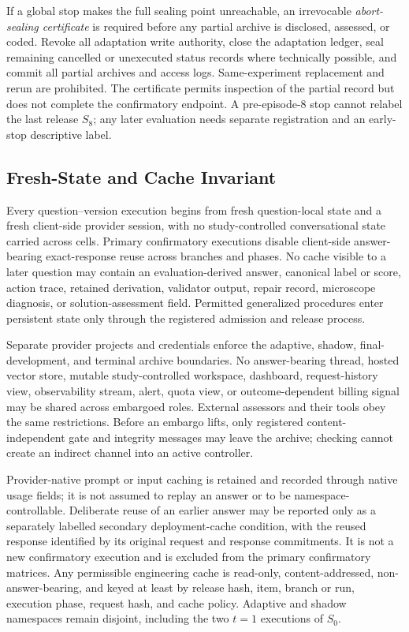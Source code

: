 \documentclass[10pt]{article} %
\providecommand{\1}{\mathbf{1}}  %
\theoremstyle{remark}
\theoremstyle{definition}
\begin{document}
If a global stop makes the full sealing point unreachable, an irrevocable
\emph{abort-sealing certificate} is required before any partial archive is
disclosed, assessed, or coded. Revoke all adaptation write authority, close
the adaptation ledger, seal remaining cancelled or unexecuted status records
where technically possible, and commit all partial archives and access logs.
Same-experiment replacement and rerun are prohibited. The certificate permits
inspection of the partial record but does not complete the confirmatory
endpoint. A pre-episode-8 stop cannot relabel the last release $S_8$; any later
evaluation needs separate registration and an early-stop descriptive label.

\subsection{Fresh-State and Cache Invariant}
\label{subsec:execution-isolation}

Every question--version execution begins from fresh question-local
state and a fresh client-side provider session, with no study-controlled
conversational state carried across cells. Primary confirmatory
executions disable client-side answer-bearing exact-response reuse
across branches and phases. No cache visible to a later question
may contain an evaluation-derived answer, canonical label or score,
action trace, retained derivation, validator output, repair record,
microscope diagnosis, or solution-assessment field. Permitted
generalized procedures enter persistent state only through the
registered admission and release process.

Separate provider projects and credentials enforce the adaptive, shadow,
final-development, and terminal archive boundaries. No answer-bearing thread,
hosted vector store, mutable study-controlled workspace, dashboard,
request-history view, observability stream, alert, quota view, or
outcome-dependent billing signal may be shared across embargoed roles.
External assessors and their tools obey the same restrictions. Before an
embargo lifts, only registered content-independent gate and integrity
messages may leave the archive; checking cannot create an indirect channel
into an active controller.

Provider-native prompt or input caching is retained and recorded
through native usage fields; it is not assumed to replay an answer
or to be namespace-controllable. Deliberate reuse of an earlier
answer may be reported only as a separately labelled secondary
deployment-cache condition, with the reused response identified by
its original request and response commitments. It is not a new
confirmatory execution and is excluded from the primary confirmatory
matrices. Any permissible engineering cache is read-only,
content-addressed, non-answer-bearing, and keyed at least by release
hash, item, branch or run, execution phase, request hash, and cache
policy. Adaptive and shadow namespaces remain disjoint, including
the two $t=1$ executions of $S_0$.
\end{document}
